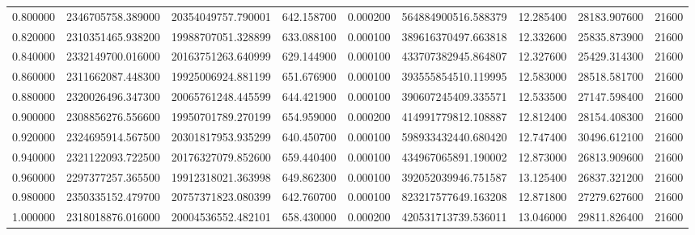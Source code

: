 \begin{tabular}{lrrrrrrrr}
0.800000 & 2346705758.389000 & 20354049757.790001 & 642.158700 & 0.000200 & 564884900516.588379 & 12.285400 & 28183.907600 & 21600 \\
0.820000 & 2310351465.938200 & 19988707051.328899 & 633.088100 & 0.000100 & 389616370497.663818 & 12.332600 & 25835.873900 & 21600 \\
0.840000 & 2332149700.016000 & 20163751263.640999 & 629.144900 & 0.000100 & 433707382945.864807 & 12.327600 & 25429.314300 & 21600 \\
0.860000 & 2311662087.448300 & 19925006924.881199 & 651.676900 & 0.000100 & 393555854510.119995 & 12.583000 & 28518.581700 & 21600 \\
0.880000 & 2320026496.347300 & 20065761248.445599 & 644.421900 & 0.000100 & 390607245409.335571 & 12.533500 & 27147.598400 & 21600 \\
0.900000 & 2308856276.556600 & 19950701789.270199 & 654.959000 & 0.000200 & 414991779812.108887 & 12.812400 & 28154.408300 & 21600 \\
0.920000 & 2324695914.567500 & 20301817953.935299 & 640.450700 & 0.000100 & 598933432440.680420 & 12.747400 & 30496.612100 & 21600 \\
0.940000 & 2321122093.722500 & 20176327079.852600 & 659.440400 & 0.000100 & 434967065891.190002 & 12.873000 & 26813.909600 & 21600 \\
0.960000 & 2297377257.365500 & 19912318021.363998 & 649.862300 & 0.000100 & 392052039946.751587 & 13.125400 & 26837.321200 & 21600 \\
0.980000 & 2350335152.479700 & 20757371823.080399 & 642.760700 & 0.000100 & 823217577649.163208 & 12.871800 & 27279.627600 & 21600 \\
1.000000 & 2318018876.016000 & 20004536552.482101 & 658.430000 & 0.000200 & 420531713739.536011 & 13.046000 & 29811.826400 & 21600 \\
\bottomrule
\end{tabular}

